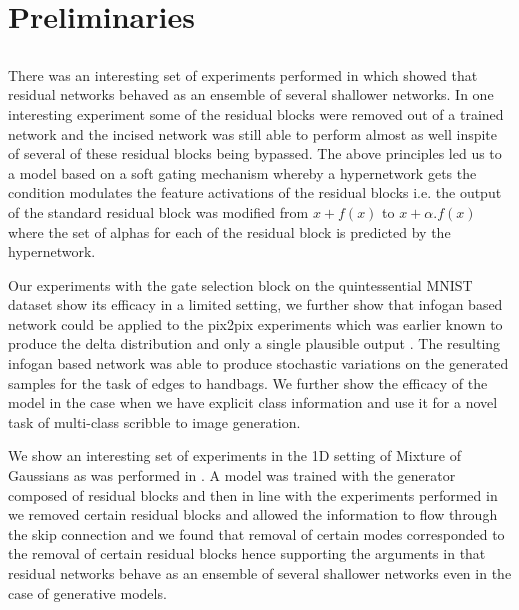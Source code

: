 \section{Preliminaries}

\subsection{}

There was an interesting set of experiments performed in \cite{veit2016residual} which showed that residual networks behaved as an ensemble of several shallower networks.
In one interesting experiment  some of the residual blocks were removed out of a trained network and the incised network was still able to perform almost as well inspite of several of these residual blocks being bypassed. 
The above principles led us to a model based on a soft gating mechanism whereby a hypernetwork gets the condition modulates the feature activations of the residual blocks i.e. the output of the standard residual block was modified from $x+f(x)$ to  $x+\alpha . f(x)$ where the set of alphas for each of the residual block is predicted by the hypernetwork. 


Our experiments with the gate selection block on the quintessential MNIST dataset show its efficacy in a limited setting, we further show that infogan based network could be applied to the pix2pix experiments which was earlier known to produce the delta distribution and only a single plausible output \cite{ghosh2017multi}. The resulting infogan based network was able to produce stochastic variations on the generated samples for the task of edges to handbags. We further show the efficacy of the model in the case when we have explicit class information and use it for a novel task of multi-class scribble to image generation. 

We show an interesting set of experiments in the 1D setting of Mixture of Gaussians as was performed in \cite{ghosh2017multi}. A model was trained with the generator composed of residual blocks and then in line with the experiments performed in \cite{veit2016residual} we removed certain residual blocks and allowed the information to flow through the skip connection and we found that removal of certain modes corresponded to the removal of certain residual blocks hence supporting the arguments in \cite{veit2016residual} that residual networks behave as an ensemble of several shallower networks even in the case of generative models.





